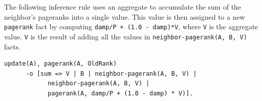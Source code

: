 The following inference rule uses an aggregate to accumulate the sum of the
neighbor's pageranks into a single value. This value is then assigned to a new
\texttt{pagerank} fact by computing \texttt{damp/P + (1.0 - damp)*V}, where
\texttt{V} is the aggregate value. \texttt{V} is the result of adding all the
values in \texttt{neighbor-pagerank(A, B, V)} facts.

\begin{Verbatim}[fontsize=\scriptsize]
update(A), pagerank(A, OldRank)
      -o [sum => V | B | neighbor-pagerank(A, B, V) |
            neighbor-pagerank(A, B, V) |
            pagerank(A, damp/P + (1.0 - damp) * V)].
\end{Verbatim}


